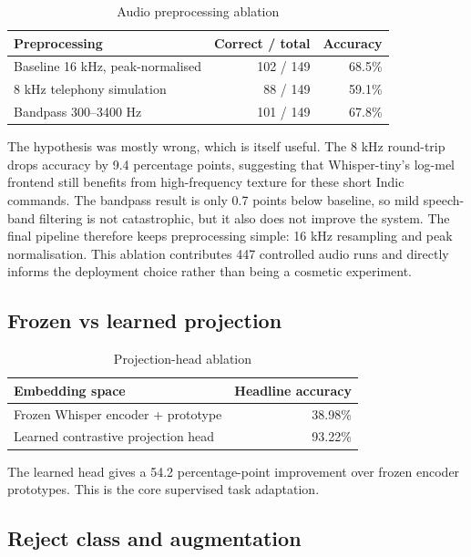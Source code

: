 \documentclass[11pt]{article}
\begin{document}
\begin{table}[h]
\centering
\caption{Audio preprocessing ablation}
\begin{tabular}{lrr}
\toprule
Preprocessing & Correct / total & Accuracy \\
\midrule
Baseline 16 kHz, peak-normalised & 102 / 149 & 68.5\% \\
8 kHz telephony simulation & 88 / 149 & 59.1\% \\
Bandpass 300--3400 Hz & 101 / 149 & 67.8\% \\
\bottomrule
\end{tabular}
\end{table}

The hypothesis was mostly wrong, which is itself useful. The 8 kHz round-trip
drops accuracy by 9.4 percentage points, suggesting that Whisper-tiny's
log-mel frontend still benefits from high-frequency texture for these short
Indic commands. The bandpass result is only 0.7 points below baseline, so mild
speech-band filtering is not catastrophic, but it also does not improve the
system. The final pipeline therefore keeps preprocessing simple: 16 kHz
resampling and peak normalisation. This ablation contributes 447 controlled
audio runs and directly informs the deployment choice rather than being a
cosmetic experiment.

\subsection{Frozen vs learned projection}

\begin{table}[h]
\centering
\caption{Projection-head ablation}
\begin{tabular}{lr}
\toprule
Embedding space & Headline accuracy \\
\midrule
Frozen Whisper encoder + prototype & 38.98\% \\
Learned contrastive projection head & 93.22\% \\
\bottomrule
\end{tabular}
\end{table}

The learned head gives a 54.2 percentage-point improvement over frozen
encoder prototypes. This is the core supervised task adaptation.

\subsection{Reject class and augmentation}
\end{document}
